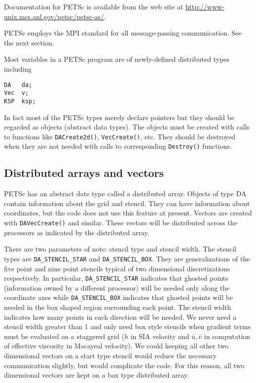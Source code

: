 \documentclass[final]{amsart}
\renewcommand{\t}[1]{\texttt{#1}}
\begin{document}
Documentation for PETSc is available from the web site at \url{http://www-unix.mcs.anl.gov/petsc/petsc-as/}.

PETSc employs the MPI standard for all message-passing communication.  See the next section.

Most variables in a PETSc program are of newly-defined distributed types including
\begin{verbatim}
DA   da;
Vec  v;
KSP  ksp;
\end{verbatim}
In fact most of the PETSc types merely declare pointers but they should be regarded as objects (abstract data types).  The objects must be created with calls to functions like \t{DACreate2d()}, \t{VecCreate()}, etc.  They should be destroyed when they are not needed with calls to corresponding \t{Destroy()} functions.

\subsection{Distributed arrays and vectors}
PETSc has an abstract date type called a distributed array. Objects of type DA contain
information about the grid and stencil. They can have information about coordinates, but
the code does not use this feature at present. Vectors are created with
\texttt{DAVecCreate()} and similar. These vectors will be distributed across the
processors as indicated by the distributed array.

There are two parameters of note: stencil type and stencil width. The stencil types are
\verb|DA_STENCIL_STAR| and \verb|DA_STENCIL_BOX|. They are generalizations of the five
point and nine point stencils typical of two dimensional discretizations respectively. In
particular, \verb|DA_STENCIL_STAR| indicates that ghosted points (information owned by a
different processor) will be needed only along the coordinate axes while
\verb|DA_STENCIL_BOX| indicates that ghosted points will be needed in the box shaped
region surrounding each point. The stencil width indicates how many points in each
direction will be needed. We never need a stencil width greater than 1 and only need box
style stencils when gradient terms must be evaluated on a staggered grid ($h$ in SIA
velocity and $\bar{u},\bar{v}$ in computation of effective viscosity in Macayeal
velocity). We could keeping all other two dimensional vectors on a start type stencil
would reduce the necessary communication slightly, but would complicate the code. For this
reason, all two dimensional vectors are kept on a box type distributed array.
\end{document}
